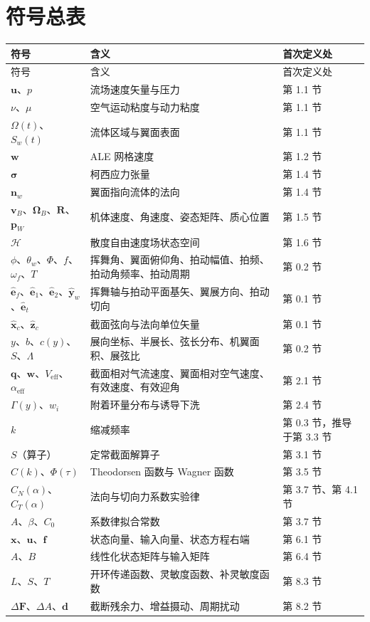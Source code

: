 \documentclass[11pt,a4paper]{ctexart}
\numberwithin{equation}{section}
\begin{document}
\appendix

\section{符号总表}

\begin{longtable}{@{} >{\raggedright\arraybackslash}p{4.6cm} >{\raggedright\arraybackslash}p{6.4cm} >{\raggedright\arraybackslash}p{3.2cm} @{}}
\toprule
符号 & 含义 & 首次定义处 \\
\midrule
\endfirsthead
\toprule
符号 & 含义 & 首次定义处 \\
\midrule
\endhead
\bottomrule
\endfoot
$\bm{u}$、$p$ & 流场速度矢量与压力 & 第 1.1 节 \\
$\nu$、$\mu$ & 空气运动粘度与动力粘度 & 第 1.1 节 \\
$\Omega(t)$、$S_w(t)$ & 流体区域与翼面表面 & 第 1.1 节 \\
$\bm{w}$ & ALE 网格速度 & 第 1.2 节 \\
$\bm{\sigma}$ & 柯西应力张量 & 第 1.4 节 \\
$\bm{n}_w$ & 翼面指向流体的法向 & 第 1.4 节 \\
$\bm{v}_B$、$\bm{\Omega}_B$、$\bm{R}$、$\bm{p}_W$ & 机体速度、角速度、姿态矩阵、质心位置 & 第 1.5 节 \\
$\mathcal{H}$ & 散度自由速度场状态空间 & 第 1.6 节 \\
$\phi$、$\theta_w$、$\Phi$、$f$、$\omega_f$、$T$ & 挥舞角、翼面俯仰角、拍动幅值、拍频、拍动角频率、拍动周期 & 第 0.2 节 \\
$\hat{\bm{e}}_f$、$\hat{\bm{e}}_1$、$\hat{\bm{e}}_2$、$\hat{\bm{y}}_w$、$\hat{\bm{e}}_t$ & 挥舞轴与拍动平面基矢、翼展方向、拍动切向 & 第 0.1 节 \\
$\hat{\bm{x}}_c$、$\hat{\bm{z}}_c$ & 截面弦向与法向单位矢量 & 第 0.1 节 \\
$y$、$b$、$c(y)$、$S$、$\Lambda$ & 展向坐标、半展长、弦长分布、机翼面积、展弦比 & 第 0.2 节 \\
$\bm{q}$、$\bm{w}$、$V_{\text{eff}}$、$\alpha_{\text{eff}}$ & 截面相对气流速度、翼面相对空气速度、有效速度、有效迎角 & 第 2.1 节 \\
$\Gamma(y)$、$w_i$ & 附着环量分布与诱导下洗 & 第 2.4 节 \\
$k$ & 缩减频率 & 第 0.3 节，推导于第 3.3 节 \\
$S$（算子） & 定常截面解算子 & 第 3.1 节 \\
$C(k)$、$\Phi(\tau)$ & Theodorsen 函数与 Wagner 函数 & 第 3.5 节 \\
$C_N(\alpha)$、$C_T(\alpha)$ & 法向与切向力系数实验律 & 第 3.7 节、第 4.1 节 \\
$A$、$\beta$、$C_0$ & 系数律拟合常数 & 第 3.7 节 \\
$\bm{x}$、$\bm{u}$、$\bm{f}$ & 状态向量、输入向量、状态方程右端 & 第 6.1 节 \\
$A$、$B$ & 线性化状态矩阵与输入矩阵 & 第 6.4 节 \\
$L$、$S$、$T$ & 开环传递函数、灵敏度函数、补灵敏度函数 & 第 8.3 节 \\
$\Delta\bm{F}$、$\Delta A$、$\bm{d}$ & 截断残余力、增益摄动、周期扰动 & 第 8.2 节 \\
\end{longtable}
\end{document}
